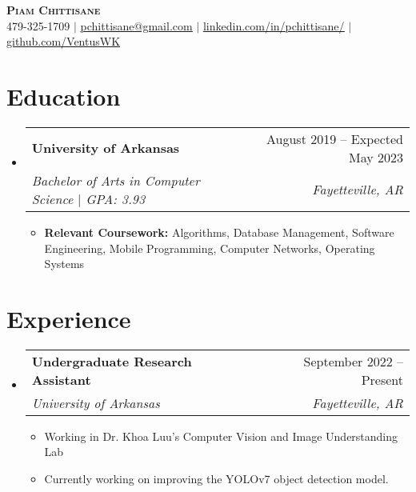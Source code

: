 \documentclass[letterpaper,11pt]{article}
\makeatletter
\newcommand{\resumeItem}[1]{
  \item\small{
    {#1 \vspace{-2pt}}
  }
}
\newcommand{\resumeSubheading}[4]{
  \vspace{-2pt}\item
    \begin{tabular*}{0.97\textwidth}[t]{l@{\extracolsep{\fill}}r}
      \textbf{#1} & #2 \\
      \textit{\small#3} & \textit{\small #4} \\
    \end{tabular*}\vspace{-7pt}
}
\newcommand{\resumeSubSubheading}[2]{
    \item
    \begin{tabular*}{0.97\textwidth}{l@{\extracolsep{\fill}}r}
      \textit{\small#1} & \textit{\small #2} \\
    \end{tabular*}\vspace{-7pt}
}
\newcommand{\resumeSubHeadingListStart}{\begin{itemize}[leftmargin=0.15in, label={}]}
\newcommand{\resumeSubHeadingListEnd}{\end{itemize}}
\newcommand{\resumeItemListStart}{\begin{itemize}}
\newcommand{\resumeItemListEnd}{\end{itemize}\vspace{-5pt}}
\makeatother
\begin{document}

\begin{center}
    \textbf{\Huge \scshape Piam Chittisane} \\ \vspace{1pt}
    \small 479-325-1709 $|$ \href{mailto:pchittisane@gmail.com}{\underline{pchittisane@gmail.com}} $|$ 
    \href{https://linkedin.com/in/pchittisane}{\underline{linkedin.com/in/pchittisane/}} $|$
    \href{https://github.com/VentusWK}{\underline{github.com/VentusWK}}
\end{center}


\section{Education}
  \resumeSubHeadingListStart
    \resumeSubheading
      {University of Arkansas}{August 2019 -- Expected May 2023}
      {Bachelor of Arts in Computer Science $\mid$ GPA: 3.93}{Fayetteville, AR}
      \resumeItemListStart
        \resumeItem{\textbf{Relevant Coursework:}{ Algorithms, Database Management, Software Engineering, Mobile Programming, Computer Networks, Operating Systems} }
      \resumeItemListEnd
  \resumeSubHeadingListEnd
  


\section{Experience}
  \resumeSubHeadingListStart

    \resumeSubheading
      {Undergraduate Research Assistant}{September 2022 -- Present}
      {University of Arkansas}{Fayetteville, AR}
      \resumeItemListStart
        \resumeItem{Working in Dr. Khoa Luu's Computer Vision and Image Understanding Lab}
        \resumeItem{Currently working on improving the YOLOv7 object detection model.}
      \resumeItemListEnd
      
  \resumeSubHeadingListEnd
\end{document}
